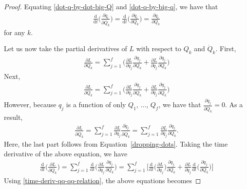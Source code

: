 \documentclass[10pt]{article}
\newcommand{\dee}{\mathrm{d}}
\begin{document}
\begin{itemize}
\begin{proof}
  		Equating \eqref{dot-q-by-dot-big-Q} and \eqref{dot-q-by-big-q}, we have that
  		\begin{align} \label{time-deriv-qq-qq-relation}
  			\frac{\dee}{\dee t}\bigg( \frac{\partial \dot{q}_i}{\partial \dot{Q}_k} \bigg)
  			= \frac{\dee}{\dee t}\bigg( \frac{\partial q_i}{\partial Q_k} \bigg)
  			= \frac{\partial \dot{q}_i}{\partial Q_k}
  		\end{align}
  		for any $k$.

  		Let us now take the partial derivatives of $L$ with respect to $Q_k$ and $\dot{Q}_k$. First,
  		\begin{align} \label{partial-L-partial-Q}
  			\frac{\partial L}{\partial Q_k}
  			= \sum_{j=1}^f \bigg( \frac{\partial L}{\partial q_j} \frac{\partial q_j}{\partial Q_k}  + \frac{\partial L}{\partial \dot{q}_j} \frac{\partial \dot{q}_j}{\partial Q_k} \bigg)
  		\end{align}
  		Next,
  		\begin{align*}
  			\frac{\partial L}{\partial \dot{Q}_k}
  			= \sum_{j=1}^f \bigg( \frac{\partial L}{\partial q_j} \frac{\partial q_j}{\partial \dot{Q}_k}  + \frac{\partial L}{\partial \dot{q}_j} \frac{\partial \dot{q}_j}{\partial \dot{Q}_k} \bigg)
  		\end{align*}
  		However, because $q_j$ is a function of only $Q_1$, $\dotsc$, $Q_f$, we have that $\frac{\partial q_j}{\partial \dot{Q}_k} = 0$. As a result,
  		\begin{align*}
  			\frac{\partial L}{\partial \dot{Q}_k}
  			= \sum_{j=1}^f \frac{\partial L}{\partial \dot{q}_j} \frac{\partial \dot{q}_j}{\partial \dot{Q}_k}
  			= \sum_{j=1}^f \frac{\partial L}{\partial \dot{q}_j} \frac{\partial q_j}{\partial Q_k}.
  		\end{align*}
  		Here, the last part follows from Equation~\eqref{dropping-dots}. Taking the time derivative of the above equation, we have
  		\begin{align*}
  			\frac{\dee}{\dee t} \bigg( \frac{\partial L}{\partial \dot{Q}_k} \bigg)
  			= \sum_{j=1}^f \frac{\dee}{\dee t} \bigg( \frac{\partial L}{\partial \dot{q}_j} \frac{\partial q_j}{\partial Q_k} \bigg)
  			= \sum_{j=1}^f 
  			\bigg[ 
  			\frac{\dee}{\dee t} \bigg( \frac{\partial L}{\partial \dot{q}_j} \bigg) \frac{\partial q_j}{\partial Q_k}
  			+  \frac{\partial L}{\partial \dot{q}_j} \frac{\dee}{\dee t} \bigg( \frac{\partial q_j}{\partial Q_k} \bigg)
  			\bigg]
  		\end{align*}
  		Using \eqref{time-deriv-qq-qq-relation}, the above equations becomes

\end{proof}
\end{itemize}
\end{document}
